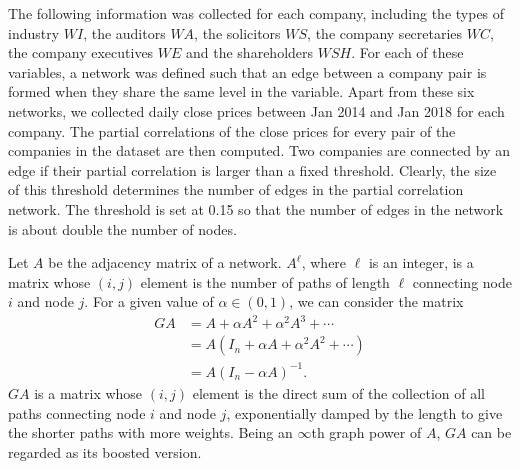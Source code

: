 \documentclass[times, doublespace]{auth}
\begin{document}
The following information was collected for each company, including the types of industry $WI$, the auditors $WA$, the solicitors $WS$, the company secretaries $WC$, the company executives $WE$ and the shareholders $WSH$. For each of these variables, a network was defined such that an edge between a company pair is formed when they share the same level in the variable. Apart from these six networks, we collected daily close prices between Jan 2014 and Jan 2018 for each company. The partial correlations of the close prices for every pair of the companies in the dataset are then computed. Two companies are connected by an edge if their partial correlation is larger than a fixed threshold. Clearly, the size of this threshold determines the number of edges in the partial correlation network. The threshold is set at 0.15 so that the number of edges in the network is about double the number of nodes. 
\newline

Let $A$ be the adjacency matrix of a network. $A^{\ell}$, where $\ell$ is an integer, is a matrix whose $(i,j)$ element is the number of paths of length $\ell$ connecting node $i$ and node $j$. For a given value of $\alpha \in (0,1)$, we can consider the matrix
\begin{equation}
\label{eqn: 15}
\begin{array}{rl}
GA &= A + \alpha A^{2} + \alpha^{2} A^{3} + \cdots\\
&= A(I_{n} + \alpha A + \alpha^{2} A^{2} + \cdots )\\ 
&= A(I_{n} - \alpha A)^{-1}.
\end{array}
\end{equation}
$GA$ is a matrix whose $(i,j)$ element is the direct sum of the collection of all paths connecting node $i$ and node $j$, exponentially damped by the length to give the shorter paths with more weights. Being an $\infty$th graph power of $A$, $GA$ can be regarded as its boosted version. 
\newline
\end{document}

